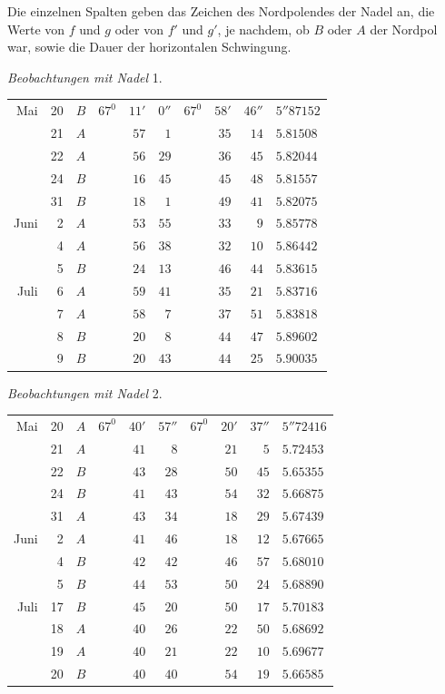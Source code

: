 Die einzelnen Spalten geben das Zeichen des Nordpolendes der Nadel an, die Werte von $f$ und $g$ oder von $f'$ und $g'$, je nachdem, ob $B$ oder $A$ der Nordpol war, sowie die Dauer der horizontalen Schwingung.

\begin{center}
\textit{Beobachtungen mit Nadel} 1.

\begin{tabular}{rr|c|rrr|rrr|l}
Mai&20&$B$&$67^0$&$11'$&$0''$&$67^0$&$58'$&$46''$&$5''87152$\\
&21&$A$&&$57$&$1$&&$35$&$14$&$5.81508$\\
&22&$A$&&$56$&$29$&&$36$&$45$&$5.82044$\\
&24&$B$&&$16$&$45$&&$45$&$48$&$5.81557$\\
&31&$B$&&$18$&$1$&&$49$&$41$&$5.82075$\\
Juni&2&$A$&&$53$&$55$&&$33$&$9$&$5.85778$\\
&4&$A$&&$56$&$38$&&$32$&$10$&$5.86442$\\
&5&$B$&&$24$&$13$&&$46$&$44$&$5.83615$\\
Juli&6&$A$&&$59$&$41$&&$35$&$21$&$5.83716$\\
&7&$A$&&$58$&$7$&&$37$&$51$&$5.83818$\\
&8&$B$&&$20$&$8$&&$44$&$47$&$5.89602$\\
&9&$B$&&$20$&$43$&&$44$&$25$&$5.90035$
\end{tabular}
\end{center}

\begin{center}
\textit{Beobachtungen mit Nadel} 2.

\begin{tabular}{rr|c|rrr|rrr|l}
Mai&20&$A$&$67^0$&$40'$&$57''$&$67^0$&$20'$&$37''$&$5''72416$\\
&21&$A$&&$41$&$8$&&$21$&$5$&$5.72453$\\
&22&$B$&&$43$&$28$&&$50$&$45$&$5.65355$\\
&24&$B$&&$41$&$43$&&$54$&$32$&$5.66875$\\
&31&$A$&&$43$&$34$&&$18$&$29$&$5.67439$\\
Juni&2&$A$&&$41$&$46$&&$18$&$12$&$5.67665$\\
&4&$B$&&$42$&$42$&&$46$&$57$&$5.68010$\\
&5&$B$&&$44$&$53$&&$50$&$24$&$5.68890$\\
Juli&17&$B$&&$45$&$20$&&$50$&$17$&$5.70183$\\
&18&$A$&&$40$&$26$&&$22$&$50$&$5.68692$\\
&19&$A$&&$40$&$21$&&$22$&$10$&$5.69677$\\
&20&$B$&&$40$&$40$&&$54$&$19$&$5.66585$
\end{tabular}
\end{center}

